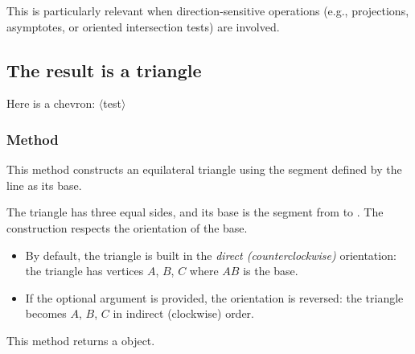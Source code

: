 \medskip
\noindent
This is particularly relevant when direction-sensitive operations (e.g., projections, asymptotes, or oriented intersection tests) are involved.

\vspace{1em}
\begin{tkzexample}[latex=7cm]
\end{tkzexample}

\subsection{The result is a triangle}

Here is a chevron: $\langle$test$\rangle$


\subsubsection{Method }
\label{ssub:method_line_equilateral}

This method constructs an equilateral triangle using the segment defined by the line as its base.

\medskip
\noindent
The triangle has three equal sides, and its base is the segment from  to . The construction respects the orientation of the base.

\begin{itemize}
  \item By default, the triangle is built in the \emph{direct (counterclockwise)} orientation: the triangle has vertices $A$, $B$, $C$ where $AB$ is the base.
  \item If the optional argument  is provided, the orientation is reversed: the triangle becomes $A$, $B$, $C$ in indirect (clockwise) order.
\end{itemize}

\medskip
\noindent
This method returns a  object.


